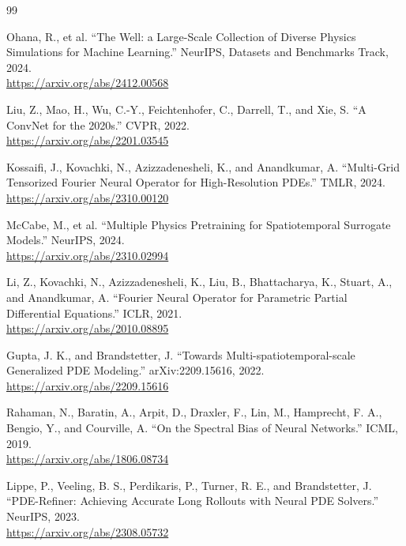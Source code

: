\documentclass[11pt]{article}
\begin{document}

\clearpage

\begin{thebibliography}{99}
\setlength{\itemsep}{8pt}

Ohana, R., et al.
``The Well: a Large-Scale Collection of Diverse Physics Simulations for Machine Learning.''
NeurIPS, Datasets and Benchmarks Track, 2024.\\
\url{https://arxiv.org/abs/2412.00568}

Liu, Z., Mao, H., Wu, C.-Y., Feichtenhofer, C., Darrell, T., and Xie, S.
``A ConvNet for the 2020s.''
CVPR, 2022.\\
\url{https://arxiv.org/abs/2201.03545}

Kossaifi, J., Kovachki, N., Azizzadenesheli, K., and Anandkumar, A.
``Multi-Grid Tensorized Fourier Neural Operator for High-Resolution PDEs.''
TMLR, 2024.\\
\url{https://arxiv.org/abs/2310.00120}

McCabe, M., et al.
``Multiple Physics Pretraining for Spatiotemporal Surrogate Models.''
NeurIPS, 2024.\\
\url{https://arxiv.org/abs/2310.02994}

Li, Z., Kovachki, N., Azizzadenesheli, K., Liu, B., Bhattacharya, K., Stuart, A., and Anandkumar, A.
``Fourier Neural Operator for Parametric Partial Differential Equations.''
ICLR, 2021.\\
\url{https://arxiv.org/abs/2010.08895}

Gupta, J. K., and Brandstetter, J.
``Towards Multi-spatiotemporal-scale Generalized PDE Modeling.''
arXiv:2209.15616, 2022.\\
\url{https://arxiv.org/abs/2209.15616}

Rahaman, N., Baratin, A., Arpit, D., Draxler, F., Lin, M., Hamprecht, F. A., Bengio, Y., and Courville, A.
``On the Spectral Bias of Neural Networks.''
ICML, 2019.\\
\url{https://arxiv.org/abs/1806.08734}

Lippe, P., Veeling, B. S., Perdikaris, P., Turner, R. E., and Brandstetter, J.
``PDE-Refiner: Achieving Accurate Long Rollouts with Neural PDE Solvers.''
NeurIPS, 2023.\\
\url{https://arxiv.org/abs/2308.05732}


\end{thebibliography}
\end{document}
